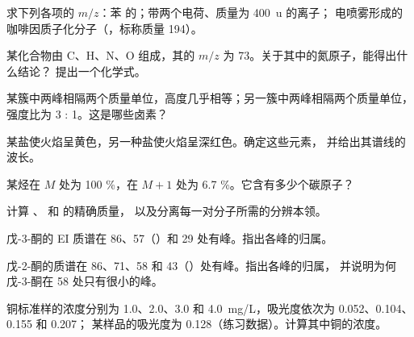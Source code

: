 \begin{exercise}[$\star$]\label{exo:b2:mass-spec-atomic:1}
求下列各项的 $m/z$：苯  的；带两个电荷、质量为 \qty{400}{u} 的离子；
电喷雾形成的咖啡因质子化分子（，标称质量 194）。
\end{exercise}

\begin{exercise}[$\star$]\label{exo:b2:mass-spec-atomic:2}
某化合物由 C、H、N、O 组成，其的 $m/z$ 为 73。关于其中的氮原子，能得出什么结论？
提出一个化学式。
\end{exercise}

\begin{exercise}[$\star$]\label{exo:b2:mass-spec-atomic:3}
某簇中两峰相隔两个质量单位，高度几乎相等；另一簇中两峰相隔两个质量单位，
强度比为 3 : 1。这是哪些卤素？
\end{exercise}

\begin{exercise}[$\star$]\label{exo:b2:mass-spec-atomic:4}
某盐使火焰呈黄色，另一种盐使火焰呈深红色。确定这些元素，
并给出其谱线的波长。
\end{exercise}

\begin{exercise}[$\star\star$]\label{exo:b2:mass-spec-atomic:5}
某烃在 $M$ 处为 100 \%，在 $M+1$ 处为 6.7 \%。它含有多少个碳原子？
\end{exercise}

\begin{exercise}[$\star\star$]\label{exo:b2:mass-spec-atomic:6}
计算 、 和  的精确质量，
以及分离每一对分子所需的分辨本领。
\end{exercise}

\begin{exercise}[$\star\star$]\label{exo:b2:mass-spec-atomic:7}
戊-3-酮的 EI 质谱在 86、57（）和 29 处有峰。指出各峰的归属。
\end{exercise}

\begin{exercise}[$\star\star$]\label{exo:b2:mass-spec-atomic:8}
戊-2-酮的质谱在 86、71、58 和 43（）处有峰。指出各峰的归属，
并说明为何戊-3-酮在 58 处只有很小的峰。
\end{exercise}

\begin{exercise}[$\star\star$]\label{exo:b2:mass-spec-atomic:9}
铜标准样的浓度分别为 1.0、2.0、3.0 和 \qty{4.0}{mg/L}，吸光度依次为 0.052、0.104、0.155 和 0.207；
某样品的吸光度为 0.128（练习数据）。计算其中铜的浓度。
\end{exercise}

